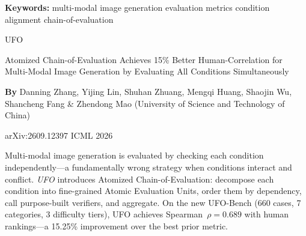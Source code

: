 \documentclass[10pt,twocolumn]{article}
\begin{document}
\setlength{\parindent}{0pt}
\setlength{\parskip}{4pt}

{\small\color{keywordgray}\textbf{Keywords:}
  multi-modal image generation \textbullet{}
  evaluation metrics \textbullet{}
  condition alignment \textbullet{}
  chain-of-evaluation}\par\vspace{4pt}

{\LARGE\bfseries\raggedright
  UFO}\par\vspace{4pt}

{\large\itshape\raggedright
  Atomized Chain-of-Evaluation Achieves 15\% Better Human-Correlation for
  Multi-Modal Image Generation by Evaluating All Conditions Simultaneously}\par\vspace{6pt}

{\small\textbf{By} Danning Zhang, Yijing Lin, Shuhan Zhuang, Mengqi Huang,
  Shaojin Wu, Shancheng Fang \& Zhendong Mao
  (University of Science and Technology of China)}\par\vspace{2pt}

{\small\color{keywordgray}arXiv:2609.12397 \textbullet{} ICML 2026}
\par\vspace{2pt}\noindent{\color{rulered}\rule{\columnwidth}{0.6pt}}\vspace{6pt}

Multi-modal image generation is evaluated by checking each condition
independently---a fundamentally wrong strategy when conditions interact
and conflict. \textit{UFO} introduces Atomized Chain-of-Evaluation:
decompose each condition into fine-grained Atomic Evaluation Units,
order them by dependency, call purpose-built verifiers, and aggregate.
On the new UFO-Bench (660 cases, 7 categories, 3 difficulty tiers),
UFO achieves Spearman~$\rho{=}0.689$ with human rankings---a 15.25\%
improvement over the best prior metric.
\end{document}
